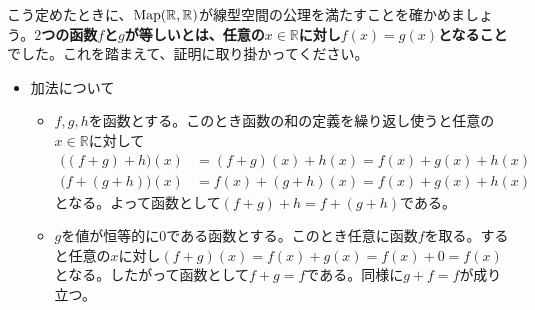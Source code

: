 こう定めたときに、$\operatorname{Map}(\mathbb{R}, \mathbb{R})$が線型空間の公理を満たすことを確かめましょう。\textbf{$2$つの函数$f$と$g$が等しいとは、任意の$x\in\mathbb{R}$に対し$f(x) = g(x)$となること}でした。これを踏まえて、証明に取り掛かってください。
\begin{itemize}
\item 加法について
\begin{itemize}
\item $f, g, h$を函数とする。このとき函数の和の定義を繰り返し使うと任意の$x\in\mathbb{R}$に対して
\begin{align*}
\bigl((f + g) + h\bigr)(x) &= (f + g)(x) + h(x) = f(x) + g(x) + h(x) \\
\bigl(f + (g + h)\bigr)(x) &= f(x) + (g + h)(x) = f(x) + g(x) + h(x)
\end{align*}
となる。よって函数として$(f + g) + h = f + (g + h)$である。
\item $g$を値が恒等的に$0$である函数とする。このとき任意に函数$f$を取る。すると任意の$x$に対し$(f + g)(x) = f(x) + g(x) = f(x) + 0 = f(x)$となる。したがって函数として$f + g = f$である。同様に$g + f = f$が成り立つ。


\end{itemize}
\end{itemize}
